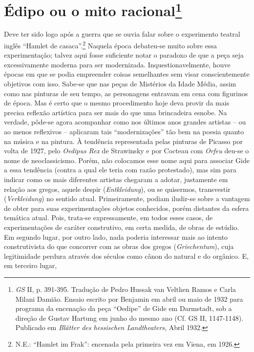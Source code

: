 \chapter{Édipo ou o mito racional\footnote[*]{\emph{GS} II, p. 391-395. Tradução de
  Pedro Hussak van Velthen Ramos e Carla Milani Damião. Ensaio escrito
  por Benjamin em abril ou maio de 1932 para programa da encenação da
  peça ``Oedipe'' de Gide em Darmstadt, sob a direção de Gustav Hartung
  em junho do mesmo ano (Cf. GS II, 1147-1148). Publicado em
  \emph{Blätter des hessischen Landtheaters}, Abril 1932.}}

Deve ter sido logo após a guerra que se ouvia falar sobre o experimento
teatral inglês ``Hamlet de casaca''.\footnote{N.E.: ``Hamlet im Frak'':
  encenada pela primeira vez em Viena, em 1926.} Naquela época
debateu-se muito sobre essa experimentação; talvez aqui fosse suficiente
notar o paradoxo de que a peça seja excessivamente moderna para ser
modernizada. Inquestionavelmente, houve épocas em que se podia
empreender coisas semelhantes sem visar conscientemente objetivos com
isso. Sabe-se que nas peças de Mistérios da Idade Média, assim como nas
pinturas de seu tempo, as personagens entravam em cena com figurinos de
época. Mas é certo que o mesmo procedimento hoje deva provir da mais
precisa reflexão artística para ser mais do que uma brincadeira esnobe.
Na verdade, pôde-se agora acompanhar como nos últimos anos grandes
artistas -- ou ao menos reflexivos -- aplicaram tais ``modernizações''
tão bem na poesia quanto na música e na pintura. À tendência
representada pelas pinturas de Picasso por volta de 1927, pelo
\emph{Oedipus Rex} de Strawinsky e por Cocteau com \emph{Orfeu} deu-se o
nome de neoclassicismo. Porém, não colocamos esse nome aqui para
associar Gide a essa tendência (contra a qual ele teria com razão
protestado), mas sim para indicar como os mais diferentes artistas
chegaram a adotar, justamente em relação aos gregos, aquele despir
(\emph{Entkleidung}), ou se quisermos, transvestir (\emph{Verkleidung})
no sentido atual. Primeiramente, podiam iludir-se sobre a vantagem de
obter para suas experimentações objetos conhecidos, porém distantes da
esfera temática atual. Pois, trata-se expressamente, em todos esses
casos, de experimentações de caráter construtivo, em certa medida, de
obras de estúdio. Em segundo lugar, por outro lado, nada poderia
interessar mais ao intento construtivista do que concorrer com as obras
dos gregos (\emph{Griechentum}), cuja legitimidade perdura através dos
séculos como cânon do natural e do orgânico. E, em terceiro lugar,
